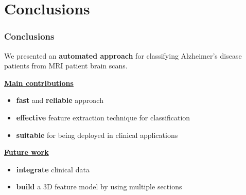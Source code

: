 \section{Conclusions}

\begin{frame}
	\frametitle{Conclusions}
	
	\Large
	
	\vspace{0.5cm}
	
	We presented an \textbf{automated approach} for classifying Alzheimer's disease patients from MRI
	patient brain scans.
	
	\vspace{0.2cm}
	
	\underline{\textbf{Main contributions}}
	
	\begin{itemize}
		\item \textbf{fast} and \textbf{reliable} approach
		\item \textbf{effective} feature extraction technique for classification
		\item \textbf{suitable} for being deployed in clinical applications
	\end{itemize}
	
	\vspace{0.2cm}
	
	\underline{\textbf{Future work}}
	
	\begin{itemize}
		\item \textbf{integrate} clinical data
		\item \textbf{build} a 3D feature model by using multiple sections
	\end{itemize}
\end{frame}
